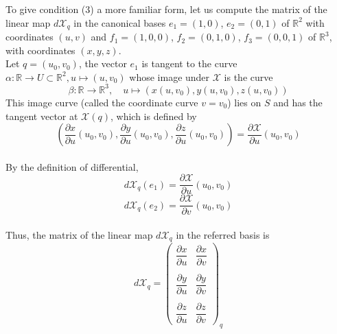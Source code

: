 \documentclass{article}
\begin{document}
\par
To give condition (3) a more familiar form, let us compute the matrix of the linear map $d\mathcal{X}_q$ in the
canonical bases $e_1 = (1,0)$, $e_2 = (0,1)$ of $\mathbb{R}^2$ with coordinates $(u,v)$ and
$f_1 = (1,0,0)$, $f_2 = (0,1,0)$, $f_3 = (0,0,1)$ of $\mathbb{R}^3$, with coordinates $(x,y,z)$.\\
Let $q = (u_0, v_0)$, the vector $e_1$ is tangent to the curve $\alpha: \mathbb{R} \to U \subset \mathbb{R}^2, u \mapsto (u,v_0)$
whose image under $\mathcal{X}$ is
the curve
$$
    \beta: \mathbb{R} \to \mathbb{R}^3, \quad u \mapsto (x(u, v_0), y(u, v_0), z(u, v_0))
$$
This image curve (called the coordinate curve $v = v_0$) lies on $S$ and has the tangent vector at $\mathcal{X}(q)$,
which is defined by
$$
    (\frac{\partial x}{\partial u}(u_0,v_0), \frac{\partial y}{\partial u}(u_0,v_0), \frac{\partial z}{\partial u}(u_0,v_0)) = \frac{\partial \mathcal{X}}{\partial u}(u_0,v_0)
$$\\
By the definition of differential,
$$
    d\mathcal{X}_q(e_1) = \frac{\partial \mathcal{X}}{\partial u}(u_0, v_0)
$$
$$
    d\mathcal{X}_q(e_2) = \frac{\partial \mathcal{X}}{\partial v}(u_0, v_0)
$$\\
Thus, the matrix of the linear map $d\mathcal{X}_q$ in the referred basis is
$$
    d\mathcal{X}_q = 
    \left(\begin{array}{cc} 
        \dfrac{\partial x}{\partial u} & \dfrac{\partial x}{\partial v} \\\\
        \dfrac{\partial y}{\partial u} & \dfrac{\partial y}{\partial v} \\\\
        \dfrac{\partial z}{\partial u} & \dfrac{\partial z}{\partial v}
    \end{array}\right)_q
$$
\end{document}

